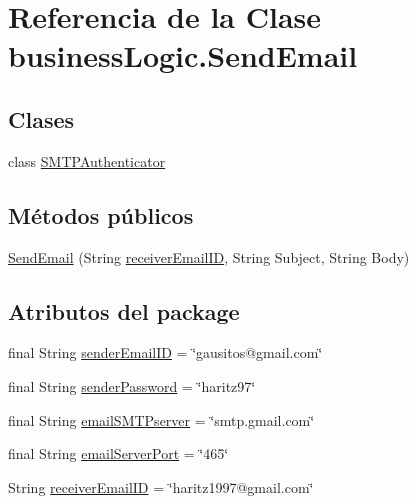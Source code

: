 \hypertarget{classbusiness_logic_1_1_send_email}{}\section{Referencia de la Clase business\+Logic.\+Send\+Email}
\label{classbusiness_logic_1_1_send_email}
\subsection*{Clases}
\begin{DoxyCompactItemize}
\item 
class \mbox{\hyperlink{classbusiness_logic_1_1_send_email_1_1_s_m_t_p_authenticator}{S\+M\+T\+P\+Authenticator}}
\end{DoxyCompactItemize}
\subsection*{Métodos públicos}
\begin{DoxyCompactItemize}
\item 
\mbox{\hyperlink{classbusiness_logic_1_1_send_email_ad544aa16db4f9e424ad3db5e8af40bb4}{Send\+Email}} (String \mbox{\hyperlink{classbusiness_logic_1_1_send_email_ac77f915d22477cea3ca986da4acffbbc}{receiver\+Email\+ID}}, String Subject, String Body)
\end{DoxyCompactItemize}
\subsection*{Atributos del \textquotesingle{}package\textquotesingle{}}
\begin{DoxyCompactItemize}
\item 
final String \mbox{\hyperlink{classbusiness_logic_1_1_send_email_a2e47b8c2228b215b8335c16ba592b95d}{sender\+Email\+ID}} = \char`\"{}gausitos@gmail.\+com\char`\"{}
\item 
final String \mbox{\hyperlink{classbusiness_logic_1_1_send_email_a0bd45a69289e50c9439e70835c06ff0c}{sender\+Password}} = \char`\"{}haritz97\char`\"{}
\item 
final String \mbox{\hyperlink{classbusiness_logic_1_1_send_email_a1c140265f179e199fc4d20fb3ebc81b6}{email\+S\+M\+T\+Pserver}} = \char`\"{}smtp.\+gmail.\+com\char`\"{}
\item 
final String \mbox{\hyperlink{classbusiness_logic_1_1_send_email_a1c99e22d5e9634a278914e9183c644a9}{email\+Server\+Port}} = \char`\"{}465\char`\"{}
\item 
String \mbox{\hyperlink{classbusiness_logic_1_1_send_email_ac77f915d22477cea3ca986da4acffbbc}{receiver\+Email\+ID}} = \char`\"{}haritz1997@gmail.\+com\char`\"{}
\end{DoxyCompactItemize}
